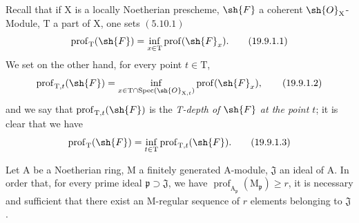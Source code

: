 \begin{env}[19.9.1]
\label{IV.19.9.1}
Recall that if $\mathrm{X}$ is a locally Noetherian prescheme, $\sh{F}$ a coherent $\sh{O}_\mathrm{X}$-Module, $\mathrm{T}$ a part of $\mathrm{X}$, one sets $(5.10.1)$
\begin{equation}
  \operatorname{prof}_\mathrm{T}(\sh{F})=\inf_{x\in\mathrm{T}}\operatorname{prof}(\sh{F}_x).
  \label{IV.19.9.1.1}
\tag{19.9.1.1}
\end{equation}
We set on the other hand, for every point $t\in\mathrm{T}$,
\begin{equation}
  \operatorname{prof}_{\mathrm{T},t}(\sh{F})=\inf_{x\in\mathrm{T}\cap\operatorname{Spec}(\sh{O}_{\mathrm{X},t})}\operatorname{prof}(\sh{F}_x),
  \label{IV.19.9.1.2}
\tag{19.9.1.2}
\end{equation}
and we say that $\operatorname{prof}_{\mathrm{T},t}(\sh{F})$ is the \emph{T-depth of $\sh{F}$ at the point $t$}; it is clear that we have
\begin{equation}
  \operatorname{prof}_\mathrm{T}(\sh{F})=\inf_{t\in\mathrm{T}}\operatorname{prof}_{\mathrm{T},t}(\sh{F}).
  \label{IV.19.9.1.3}
\tag{19.9.1.3}
\end{equation}
\end{env}

\begin{lemma}[19.9.2]
\label{IV.19.9.2}
Let $\mathrm{A}$ be a Noetherian ring, $\mathrm{M}$ a finitely generated $\mathrm{A}$-module, $\mathfrak{J}$ an ideal of $\mathrm{A}$. In order that, for every prime ideal $\mathfrak{p}\supset\mathfrak{J}$, we have $\operatorname{prof}_{\mathrm{A}_\mathfrak{p}}(\mathrm{M}_\mathfrak{p})\geqslant r$, it is necessary and sufficient that there exist an M-regular sequence of $r$ elements belonging to $\mathfrak{J}$.
\end{lemma}

